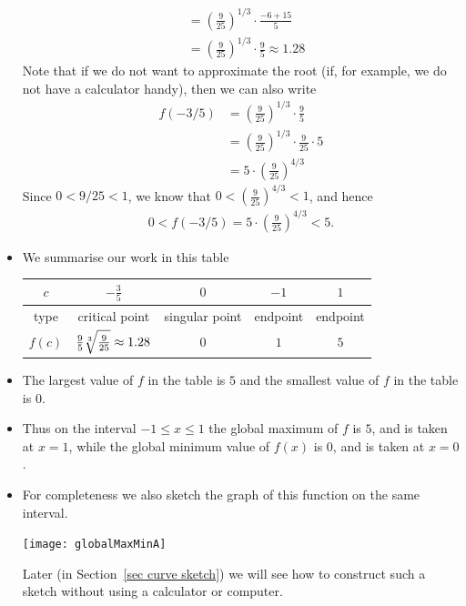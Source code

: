 \begin{eg}
\begin{itemize}
\begin{align*}
  &= \left(\frac{9}{25}\right)^{1/3} \cdot \frac{-6 + 15}{5} \\
  &= \left(\frac{9}{25}\right)^{1/3} \cdot \frac{9}{5}  \approx 1.28
\end{align*}
Note that if we do not want to approximate the root (if, for example, we do not have a
calculator handy), then we can also write
\begin{align*}
  f(-3/5) &= \left(\frac{9}{25}\right)^{1/3} \cdot \frac{9}{5} \\
  &= \left(\frac{9}{25}\right)^{1/3} \cdot \frac{9}{25} \cdot 5 \\
  &= 5 \cdot \left( \frac{9}{25} \right)^{4/3}
\end{align*}
Since $0<9/25<1$, we know that $0 < \left( \frac{9}{25} \right)^{4/3} < 1$, and hence
\begin{align*}
  0 < f(-3/5) = 5 \cdot \left( \frac{9}{25} \right)^{4/3} < 5.
\end{align*}

\item We summarise our work in this table
\begin{center}
\begin{tabular}{|c||c|c|c|c|}
\hline
$c$ & $-\frac{3}{5}$ &  $0$ &  $-1$ & $1$ \\
\hline
type & critical point & singular point & endpoint & endpoint \\
\hline
$f(c)$ & $\frac{9}{5}\root{3}\of{\frac{9}{25}}\approx 1.28$ & $0$ & $1$ & $5$\\
\hline
\end{tabular}
\end{center}
\item The largest value of $f$ in the table is $5$ and the smallest value of $f$ in the
table is $0$.
\item Thus on the interval $-1\leq x \leq 1$ the global maximum of $f$ is $5$, and is
taken at $x=1$, while the global minimum value of $f(x)$ is $0$, and is taken at $x=0$.

\item For completeness we also sketch the graph of this function on the same interval.
\begin{efig}
\begin{center}
   \texttt{[image: globalMaxMinA]}
\end{center}
\end{efig}
Later (in Section~\ref{sec curve sketch}) we will see how to construct such a sketch
without using a calculator or computer.
\end{itemize}
\end{eg}


